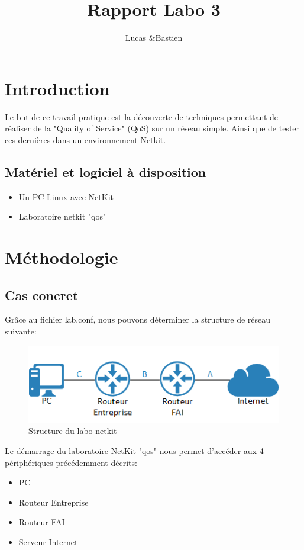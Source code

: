 \documentclass{article}
\title{Rapport Labo 3}
\author{Lucas \bsc{Bulloni} \&Bastien \bsc{Wermeille}}
\begin{document}
\maketitle

\section{Introduction}
Le but de ce travail pratique est la découverte de techniques permettant de réaliser de la "Quality of Service" (QoS) sur un réseau simple. Ainsi que de tester ces dernières dans un environnement Netkit.

\subsection{Matériel et logiciel à disposition}
\begin{itemize}
	\item Un PC Linux avec NetKit
	\item Laboratoire netkit "qos"
\end{itemize}

\section{Méthodologie}

\subsection{Cas concret}
Grâce au fichier lab.conf, nous pouvons déterminer la structure de réseau suivante:
\begin{figure}[h]
  \centering
  \includegraphics{./Structure.png}
  \caption{Structure du labo netkit}
  \label{fig:structure}
\end{figure}

Le démarrage du laboratoire NetKit "qos" nous permet d'accéder aux 4 périphériques précédemment décrits:
\begin{itemize}
	\item PC
	\item Routeur Entreprise
	\item Routeur FAI
	\item Serveur Internet
\end{itemize}
\end{document}
